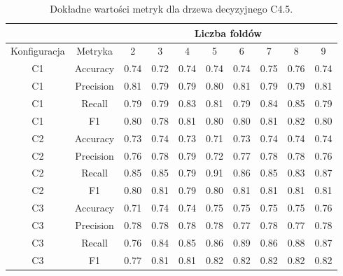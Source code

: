 \begin{table}[H]
  \center
\begin{tabular}{|c|c|c|c|c|c|c|c|c|c|}  \hline
  \multicolumn{2}{|c|}{} & \multicolumn{8}{c|}{Liczba foldów} \\ \hline
Konfiguracja &    Metryka &     2 &     3 &     4 &     5 &     6 &     7 &     8 &     9 \\ \hline
          C1 &   Accuracy &  0.74 &  0.72 &  0.74 &  0.74 &  0.74 &  0.75 &  0.76 &  0.74 \\ \hline
          C1 &  Precision &  0.81 &  0.79 &  0.79 &  0.80 &  0.81 &  0.79 &  0.79 &  0.81 \\ \hline
          C1 &     Recall &  0.79 &  0.79 &  0.83 &  0.81 &  0.79 &  0.84 &  0.85 &  0.79 \\ \hline
          C1 &         F1 &  0.80 &  0.78 &  0.81 &  0.80 &  0.80 &  0.81 &  0.82 &  0.80 \\ \hline \hline
          C2 &   Accuracy &  0.73 &  0.74 &  0.73 &  0.71 &  0.73 &  0.74 &  0.74 &  0.74 \\ \hline
          C2 &  Precision &  0.76 &  0.78 &  0.79 &  0.72 &  0.77 &  0.78 &  0.78 &  0.76 \\ \hline
          C2 &     Recall &  0.85 &  0.85 &  0.79 &  0.91 &  0.86 &  0.85 &  0.83 &  0.87 \\ \hline
          C2 &         F1 &  0.80 &  0.81 &  0.79 &  0.80 &  0.81 &  0.81 &  0.81 &  0.81 \\ \hline \hline
          C3 &   Accuracy &  0.71 &  0.74 &  0.74 &  0.75 &  0.75 &  0.75 &  0.75 &  0.76 \\ \hline
          C3 &  Precision &  0.78 &  0.78 &  0.78 &  0.78 &  0.77 &  0.78 &  0.77 &  0.78 \\ \hline
          C3 &     Recall &  0.76 &  0.84 &  0.85 &  0.86 &  0.89 &  0.86 &  0.88 &  0.87 \\ \hline
          C3 &         F1 &  0.77 &  0.81 &  0.81 &  0.82 &  0.82 &  0.82 &  0.82 &  0.82 \\ \hline
\end{tabular}


  \caption{Dokładne wartości metryk dla drzewa decyzyjnego C4.5.}
\end{table}
